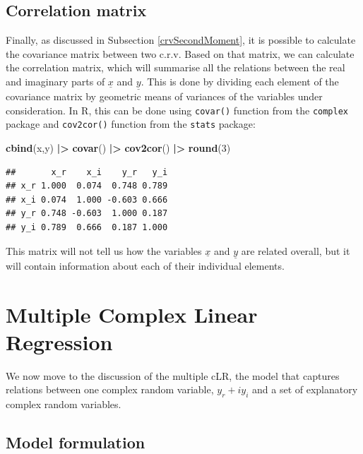 \documentclass[
]{book}
\newenvironment{Shaded}{\begin{snugshade}}{\end{snugshade}}
\newcommand{\DecValTok}[1]{\textcolor[rgb]{0.00,0.00,0.81}{#1}}
\newcommand{\ErrorTok}[1]{\textcolor[rgb]{0.64,0.00,0.00}{\textbf{#1}}}
\newcommand{\KeywordTok}[1]{\textcolor[rgb]{0.13,0.29,0.53}{\textbf{#1}}}
\newcommand{\NormalTok}[1]{#1}
\newcommand{\OperatorTok}[1]{\textcolor[rgb]{0.81,0.36,0.00}{\textbf{#1}}}
\newcommand{\StringTok}[1]{\textcolor[rgb]{0.31,0.60,0.02}{#1}}
\begin{document}
\hypertarget{correlation-matrix}{%
\section{Correlation matrix}\label{correlation-matrix}}

Finally, as discussed in Subsection \ref{crvSecondMoment}, it is possible to calculate the covariance matrix between two c.r.v. Based on that matrix, we can calculate the correlation matrix, which will summarise all the relations between the real and imaginary parts of \(\underline{x}\) and \(\underline{y}\). This is done by dividing each element of the covariance matrix by geometric means of variances of the variables under consideration. In R, this can be done using \texttt{covar()} function from the \texttt{complex} package and \texttt{cov2cor()} function from the \texttt{stats} package:

\begin{Shaded}
\begin{Highlighting}[]
\KeywordTok{cbind}\NormalTok{(x,y) }\OperatorTok{|}\ErrorTok{\textgreater{}}\StringTok{ }\KeywordTok{covar}\NormalTok{() }\OperatorTok{|}\ErrorTok{\textgreater{}}\StringTok{ }\KeywordTok{cov2cor}\NormalTok{() }\OperatorTok{|}\ErrorTok{\textgreater{}}\StringTok{ }\KeywordTok{round}\NormalTok{(}\DecValTok{3}\NormalTok{)}
\end{Highlighting}
\end{Shaded}

\begin{verbatim}
##       x_r    x_i    y_r   y_i
## x_r 1.000  0.074  0.748 0.789
## x_i 0.074  1.000 -0.603 0.666
## y_r 0.748 -0.603  1.000 0.187
## y_i 0.789  0.666  0.187 1.000
\end{verbatim}

This matrix will not tell us how the variables \(\underline{x}\) and \(\underline{y}\) are related overall, but it will contain information about each of their individual elements.

\hypertarget{multipleCLR}{%
\chapter{Multiple Complex Linear Regression}\label{multipleCLR}}

We now move to the discussion of the multiple cLR, the model that captures relations between one complex random variable, \(y_r + i y_i\) and a set of explanatory complex random variables.

\hypertarget{model-formulation}{%
\section{Model formulation}\label{model-formulation}}
\end{document}
